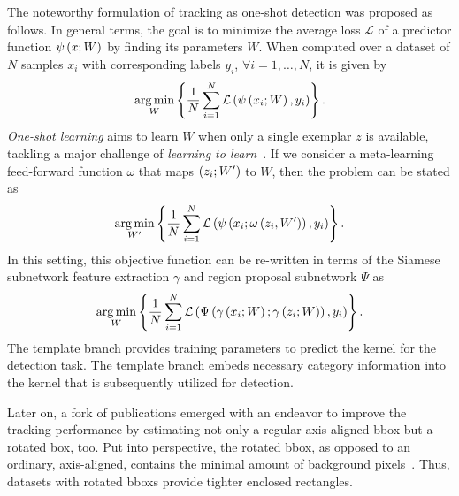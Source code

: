 The noteworthy formulation of tracking as one-shot detection was proposed as follows. In general terms, the goal is to minimize the average loss $\mathcal{L}$ of a predictor function ${\psi} \left( x; W \right)$ by finding its parameters $W$. When computed over a dataset of $N$ samples $x_i$ with corresponding labels $y_i$, $\forall i = 1, \dots, N$, it is given by
\begin{equation}
    \label{eq:SiamRPNOneShotGeneral}
    \underset{W}{\operatorname*{arg\,min}}
    \left\{ {
        \frac{1}{N}
        \sum_{i = 1}^{N}
        {\mathcal{L}} \left( 
            {\psi} \left( x_i; W \right),
            y_i
         \right)
    } \right\}.
\end{equation}
\emph{One-shot learning} aims to learn $W$ when only a single exemplar $z$ is available, tackling a major challenge of \emph{learning to learn}~\cite{bertinetto2016oneshot}. If we consider a meta-learning feed-forward function $\omega$ that maps $\left( {z_i; W'} \right)$ to $W$, then the problem can be stated as
\begin{equation}
    \label{eq:SiamRPNOneShotMetaLearning}
    \underset{W'}{\operatorname*{arg\,min}}
    \left\{ {
        \frac{1}{N}
        \sum_{i = 1}^{N}
        {\mathcal{L}} \left( 
            {\psi} \left( x_i; {\omega} \left( z_i, W' \right) \right),
            y_i
         \right)
    } \right\}.
\end{equation}
In this setting, this objective function can be re-written in terms of the Siamese subnetwork feature extraction $\gamma$ and region proposal subnetwork $\Psi$ as
\begin{equation}
    \label{eq:SiamRPNOneShoCombo}
    \underset{W}{\operatorname*{arg\,min}}
    \left\{ {
        \frac{1}{N}
        \sum_{i = 1}^{N}
        {\mathcal{L}} \left( 
            {\Psi} \left( {\gamma} \left( x_i; W \right); {\gamma} \left( z_i; W \right) \right),
            y_i
         \right)
    } \right\}.
\end{equation}
The template branch provides training parameters to predict the kernel for the detection task. The template branch embeds necessary category information into the kernel that is subsequently utilized for detection.

Later on, a fork of publications emerged with an endeavor to improve the tracking performance by estimating not only a regular axis-aligned \gls{bbox} but a rotated box, too. Put into perspective, the rotated \gls{bbox}, as opposed to an ordinary, axis-aligned, contains the minimal amount of background pixels~\cite{chen2019rotbboxes}. Thus, datasets with rotated \glspl{bbox} provide tighter enclosed rectangles.

